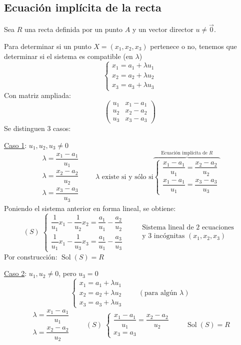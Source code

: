 \documentclass[11pt,a4paper]{article}
\DeclareMathOperator{\Sol}{Sol}
\begin{document}
\subsection{Ecuación implícita de la recta}

Sea $R$ una recta definida por un punto $A$ y un vector director $u\neq\vec0$.

Para determinar si un punto $X=(x_1,x_2,x_3)$ pertenece o no, tenemos que determinar si el sistema es compatible (en $\lambda$)
\[
\begin{cases}
x_1=a_1+\lambda u_1\\
x_2=a_2+\lambda u_2\\
x_3=a_3+\lambda u_3
\end{cases}
\]
Con matriz ampliada:
\[
\left(\begin{array}{c|c}u_1&x_1-a_1\\u_2&x_2-a_2\\u_3&x_3-a_3\end{array}\right)
\]
Se distinguen 3 casos:

\underline{Caso 1}: $u_1,u_2,u_3\neq0$
\[
\begin{array}{l}
\lambda=\dfrac{x_1-a_1}{u_1}\\[10pt]
\lambda=\dfrac{x_2-a_2}{u_2}\\[10pt]
\lambda=\dfrac{x_3-a_3}{u_3}
\end{array}
\qquad
\lambda\text{ existe si y sólo si}
\overbrace{\begin{cases}
\dfrac{x_1-a_1}{u_1}=\dfrac{x_2-a_2}{u_2}\\[10pt]
\dfrac{x_1-a_1}{u_1}=\dfrac{x_3-a_3}{u_3}
\end{cases}}^{\text{Ecuación implícita de } R}
\]
Poniendo el sistema anterior en forma lineal, se obtiene:
\[
(S)\;\begin{cases}
\dfrac{1}{u_1}x_1-\dfrac{1}{u_2}x_2=\dfrac{a_1}{u_1}-\dfrac{a_2}{u_2}\\[10pt]
\dfrac{1}{u_1}x_1-\dfrac{1}{u_3}x_3=\dfrac{a_1}{u_1}-\dfrac{a_3}{u_3}
\end{cases}
\qquad
\begin{array}{l}
\text{Sistema lineal de 2 ecuaciones}\\
\text{y 3 incógnitas } (x_1,x_2,x_3)
\end{array}
\]
Por construcción: $\Sol(S)=R$

\underline{Caso 2}: $u_1,u_2\neq0$, pero $u_3=0$
\[
\begin{cases}
x_1=a_1+\lambda u_1\\
x_2=a_2+\lambda u_2\\
x_3=a_3+\lambda u_3
\end{cases}
\qquad(\text{para algún }\lambda)
\]
\[
\begin{array}{l}
\lambda=\dfrac{x_1-a_1}{u_1}\\[10pt]
\lambda=\dfrac{x_2-a_2}{u_2}
\end{array}
\qquad
(S)\;\begin{cases}
\dfrac{x_1-a_1}{u_1}=\dfrac{x_2-a_2}{u_2}\\[10pt]
x_3=a_3
\end{cases}
\qquad\Sol(S)=R
\]
\end{document}
